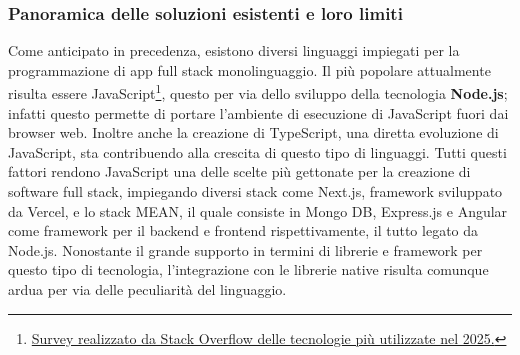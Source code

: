 \subsubsection{Panoramica delle soluzioni esistenti e loro limiti}
\label{subsec:background-fullstack-soluzioni}
Come anticipato in precedenza, esistono diversi linguaggi impiegati per la programmazione di app full stack monolinguaggio.
Il più popolare attualmente risulta essere JavaScript\footnote{\href{https://survey.stackoverflow.co/2025/technology/}{Survey realizzato da Stack Overflow delle tecnologie più utilizzate nel 2025.}}, questo per via dello sviluppo della tecnologia \textbf{Node.js}; infatti questo permette di portare l'ambiente di esecuzione di JavaScript fuori dai browser web.
Inoltre anche la creazione di TypeScript, una diretta evoluzione di JavaScript, sta contribuendo alla crescita di questo tipo di linguaggi.
Tutti questi fattori rendono JavaScript una delle scelte più gettonate per la creazione di software full stack, impiegando diversi stack come Next.js, framework sviluppato da Vercel, e lo stack MEAN, il quale consiste in Mongo DB, Express.js e Angular come framework per il backend e frontend rispettivamente, il tutto legato da Node.js.
Nonostante il grande supporto in termini di librerie e framework per questo tipo di tecnologia, l'integrazione con le librerie native risulta comunque ardua per via delle peculiarità del linguaggio.





